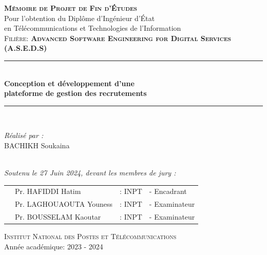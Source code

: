 \begin{titlepage}
\centering
{\LARGE \textsc{\textbf{Mémoire de Projet de Fin d’Études }}}\\[0.3cm]
{\large Pour l’obtention du Diplôme d’Ingénieur d’État\\ en Télécommunications et Technologies de l’Information }\\[0.3cm]
{ \textsc{Filière: \textbf{Advanced Software Engineering for Digital Services (A.S.E.D.S)} }}\\[0.1cm]
\vspace{0.2cm}

\rule{\linewidth}{0.4mm} \\[0.6cm] %
{ \huge \textbf{Conception et développement d'une }\\[0.2cm]\textbf{plateforme de gestion des recrutements
 }} \\[0.8cm]
\rule{\linewidth}{0.4mm} \\[0.4cm]
\vspace{0.6cm}
\noindent
\begin{minipage}{0.9\textwidth}
    \vspace{-7mm}
  \begin{flushleft} \large
    \emph{Réalisé par :} \\
     \textsc{BACHIKH} Soukaina  \\
    
  \end{flushleft}
\end{minipage}

\begin{minipage}{0.4\textwidth}
\end{minipage}\\[0.2cm]
{\large \textit{Soutenu le 27 Juin 2024, devant les membres de jury : }}\\[0.5cm]
\centering

\begin{tabular}{p{2.8cm}lll}
 & \large Pr. HAFIDDI Hatim & \large : INPT & \large - Encadrant \\[0.1cm]
 & \large Pr. LAGHOUAOUTA Youness & \large : INPT & \large - Examinateur \\[0.1cm]
 
 & \large Pr. BOUSSELAM Kaoutar  & \large : INPT & \large - Examinateur  \\[0.1cm]

\end{tabular}




\vspace{6.5cm}
\textsc{Institut National des Postes et Télécommunications}\\

\vspace{0.2cm}
{\large Année académique: 2023 - 2024}

\end{titlepage}
